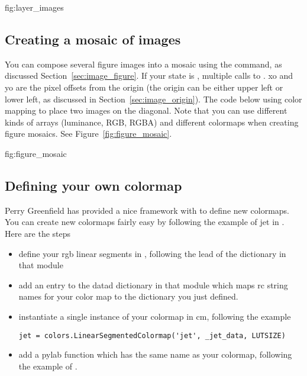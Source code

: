 \documentclass[twoside]{book}
\begin{document}
{fig:layer_images}




\subsection{Creating a mosaic of images}
\label{cbook:figure_mosaic}


You can compose several figure images into a mosaic using the
 command, as discussed Section~\ref{sec:image_figure}.  If
your  state is , multiple calls to
.  xo and yo are the pixel offsets from
the origin (the origin can be either upper left or lower left, as
discussed in Section~\ref{sec:image_origin}).  The code below using color
mapping to place two images on the diagonal.  Note that you can use
different kinds of arrays (luminance, RGB, RGBA) and different
colormaps when creating figure mosaics.  See
Figure~\ref{fig:figure_mosaic}.

{fig:figure_mosaic}




\subsection{Defining your own colormap}

Perry Greenfield has provided a nice framework with
 to define new
colormaps.  You can create new colormaps fairly easy by following the
example of jet in .  Here are the steps

\begin{itemize}
\item define your rgb linear segments in ,
  following the lead of the  dictionary in that module
  
\item add an entry to the datad dictionary in that module which maps
  rc string names for your color map to the dictionary you just
  defined.
  
\item instantiate a single instance of your colormap in cm, following
  the example 

\begin{lstlisting}
jet = colors.LinearSegmentedColormap('jet', _jet_data, LUTSIZE)
\end{lstlisting}

\item{add a pylab function which has the same name as your
    colormap, following the example of .}
\end{itemize}
\end{document}
